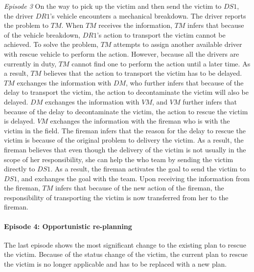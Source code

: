\begin{scenario}
\footnotesize
\emph{Episode 3} On the way to pick up the victim and then send the victim to $DS1$, the driver $DR1$'s vehicle encounters a mechanical breakdown. The driver reports the problem to $TM$. When $TM$ receives the information, $TM$ infers that because of the vehicle breakdown, $DR1$’s action to transport the victim cannot be achieved. To solve the problem, $TM$ attempts to assign another available driver with rescue vehicle to perform the action. However, because all the drivers are currently in duty, $TM$ cannot find one to perform the action until a later time. As a result, $TM$ believes that the action to transport the victim has to be delayed. $TM$ exchanges the information with $DM$, who further infers that because of the delay to transport the victim, the action to decontaminate the victim will also be delayed. $DM$ exchanges the information with $VM$, and $VM$ further infers that because of the delay to decontaminate the victim, the action to rescue the victim is delayed. $VM$ exchanges the information with the fireman who is with the victim in the field. The fireman infers that the reason for the delay to rescue the victim is because of the original problem to delivery the victim. As a result, the fireman believes that even though the delivery of the victim is not usually in the scope of her responsibility, she can help the who team by sending the victim directly to $DS1$. As a result, the fireman activates the goal to send the victim to $DS1$, and exchanges the goal with the team. Upon receiving the information from the fireman, $TM$ infers that because of the new action of the fireman, the responsibility of transporting the victim is now transferred from her to the fireman. 
\end{scenario}

\paragraph*{Episode 4: Opportunistic re-planning} %
\label{par:episode_4_opportunistic_re_planning}
The last episode shows the most significant change to the existing plan to rescue the victim. Because of the status change of the victim, the current plan to rescue the victim is no longer applicable and has to be replaced with a new plan.

